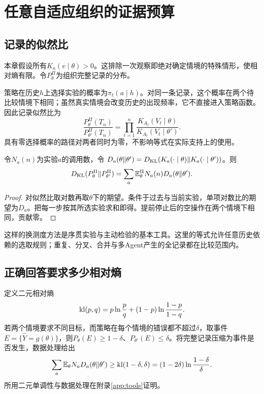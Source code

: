 \chapter{任意自适应组织的证据预算}
\label{ch:lower}

\section{记录的似然比}
本章假设所有$K_a(v\mid\theta)>0$。这排除一次观察即绝对确定情境的特殊情形，使相对熵有限。令$P_\theta^\Pi$为组织完整记录的分布。

策略在历史$h$上选择实验的概率为$\pi_t(a\mid h)$。对同一条记录，这个概率在两个待比较情境下相同；虽然真实情境会改变历史的出现频率，它不直接进入策略函数。因此记录似然比为
\[
 \frac{P_\theta^\Pi(T_n)}{P_{\theta'}^\Pi(T_n)}
 =\prod_{t=1}^n\frac{K_{A_t}(V_t\mid\theta)}{K_{A_t}(V_t\mid\theta')}.
\]
具有零选择概率的路径对两者同时为零，不影响等式在实际支持上的使用。

\begin{theorem}[自适应相对熵账本]
\label{thm:kl-ledger}
令$N_a(n)$为实验$a$的调用数，令
$D_a(\theta\Vert\theta')=D_{\mathrm{KL}}(K_a(\cdot\mid\theta)\Vert K_a(\cdot\mid\theta'))$。则
\[
 D_{\mathrm{KL}}(P_\theta^\Pi\Vert P_{\theta'}^\Pi)
 =\sum_a\mathbb E_\theta^\Pi N_a(n)D_a(\theta\Vert\theta').
\]
\end{theorem}
\begin{proof}
对似然比取对数再取$\theta$下的期望。条件于过去与当前实验，单项对数比的期望为$D_a$。把每一步按其所选实验求和即得。提前停止后的空操作在两个情境下相同，贡献零。
\end{proof}

这样的换测度方法是序贯实验与主动检验的基本工具\citep{chernoff1959,kaufmann2016}。这里的等式允许任意历史依赖的选取规则；重复、分叉、合并与多Agent产生的全记录都在比较范围内。

\section{正确回答要求多少相对熵}
定义二元相对熵
\[
 \operatorname{kl}(p,q)=p\ln\frac pq+(1-p)\ln\frac{1-p}{1-q}.
\]
若两个情境要求不同目标，而策略在每个情境的错误都不超过$\delta$，取事件$E=\{\widehat Y=g(\theta)\}$，则$P_\theta(E)\ge1-\delta$、$P_{\theta'}(E)\le\delta$。将完整记录压缩为事件是否发生，数据处理给出
\begin{equation}
 \sum_a\mathbb E_\theta N_aD_a(\theta\Vert\theta')
 \ge\operatorname{kl}(1-\delta,\delta)
 =(1-2\delta)\ln\frac{1-\delta}{\delta}.
 \label{eq:pair-lower}
\end{equation}
所用二元单调性与数据处理在附录\ref{app:tools}证明。

